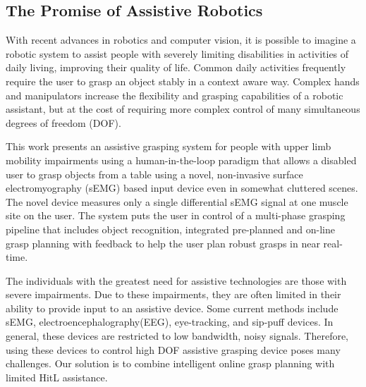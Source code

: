 \subsection{The Promise of Assistive Robotics}

With recent advances in robotics and computer vision, it is possible to imagine a
robotic  system  to  assist  people  with  severely  limiting  disabilities  in  activities  of
daily living, improving their quality of life. Common daily activities frequently require the user
to grasp an object stably in a context aware way. Complex hands and manipulators
increase the flexibility and grasping capabilities of a robotic assistant, but at the cost
of requiring more complex control of many simultaneous degrees of freedom (DOF). 

This work presents an assistive grasping system
for people  with  upper  limb  mobility
impairments using a human-in-the-loop paradigm that allows a disabled user to grasp objects
from a table using a novel, non-invasive surface electromyography (sEMG) based input device even in somewhat cluttered scenes. The novel device measures  only  a  single  differential  sEMG  signal  at  one
muscle site on the user. The system puts the user in control of a multi-phase grasping pipeline that includes object recognition, integrated pre-planned and on-line grasp planning with feedback  to  help  the  user  plan  robust  grasps  in  near  real-time.  

The individuals with the greatest need for assistive technologies are those with severe impairments. Due to these impairments, they are often limited in their ability to provide input to an assistive device. Some current methods include sEMG, electroencephalography(EEG), eye-tracking, and sip-puff devices. In general, these devices are restricted to low bandwidth, noisy signals. Therefore, using these devices to control high DOF assistive grasping device poses many challenges.  Our solution is to combine intelligent online grasp planning with limited HitL assistance.


